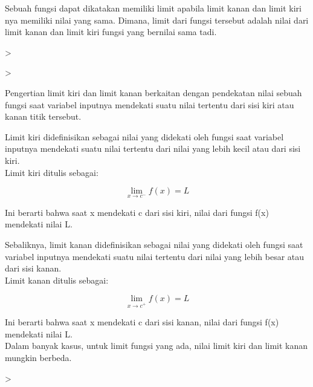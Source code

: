 \documentclass[a4paper,10pt]{article}
\begin{document}
\begin{eulernotebook}
\begin{eulercomment}
\begin{eulercomment}
\begin{eulercomment}
\begin{eulercomment}
\begin{eulercomment}
\begin{eulercomment}
\begin{eulercomment}
Sebuah fungsi dapat dikatakan memiliki limit apabila limit kanan dan
limit kiri nya memiliki nilai yang sama. Dimana, limit dari fungsi
tersebut adalah nilai dari limit kanan dan limit kiri fungsi yang
bernilai sama tadi.
\end{eulercomment}
\begin{eulerprompt}
>                                                   
\end{eulerprompt}
\begin{eulerudf}
     
\end{eulerudf}
\begin{eulerprompt}
>     
\end{eulerprompt}
\begin{eulercomment}
Pengertian limit kiri dan limit kanan berkaitan dengan pendekatan
nilai sebuah fungsi saat variabel inputnya mendekati suatu nilai
tertentu dari sisi kiri atau kanan titik tersebut.


Limit kiri didefinisikan sebagai nilai yang didekati oleh fungsi saat
variabel inputnya mendekati suatu nilai tertentu dari nilai yang lebih
kecil atau dari sisi kiri.\\
Limit kiri ditulis sebagai:

\end{eulercomment}
\begin{eulerformula}
\[
\lim \limits_{x \to c^-} {f(x)} = L
\]
\end{eulerformula}
\begin{eulercomment}
Ini berarti bahwa saat x mendekati c dari sisi kiri, nilai dari fungsi
f(x) mendekati nilai L.


Sebaliknya, limit kanan didefinisikan sebagai nilai yang didekati oleh
fungsi saat variabel inputnya mendekati suatu nilai tertentu dari
nilai yang lebih besar atau dari sisi kanan.\\
Limit kanan ditulis sebagai:

\end{eulercomment}
\begin{eulerformula}
\[
\lim \limits_{x \to c^+} {f(x)} = L
\]
\end{eulerformula}
\begin{eulercomment}
Ini berarti bahwa saat x mendekati c dari sisi kanan, nilai dari
fungsi f(x) mendekati nilai L.\\
Dalam banyak kasus, untuk limit fungsi yang ada, nilai limit kiri dan
limit kanan mungkin berbeda.
\end{eulercomment}
\begin{eulerprompt}
>                        
\end{eulerprompt}
\begin{eulerudf}
   

\end{eulerudf}
\end{eulercomment}
\end{eulercomment}
\end{eulercomment}
\end{eulercomment}
\end{eulercomment}
\end{eulercomment}
\end{eulernotebook}
\end{document}
